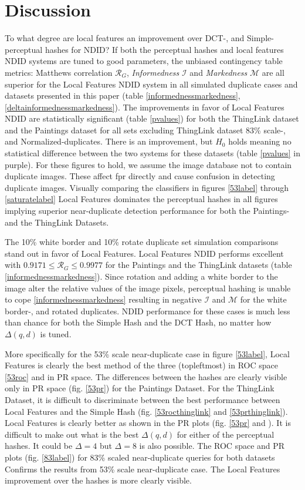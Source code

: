 \documentclass[english,12pt,a4paper,pdftex,elec,utf8, table]{aaltothesis}
\begin{document}
\section{Discussion}
To what degree are local features an improvement over DCT-, and Simple- perceptual hashes for NDID? If both the perceptual hashes and local features NDID systems are tuned to good parameters, the unbiased contingency table metrics: Matthews correlation $\mathcal{R}_G$, \emph{Informedness} $\mathcal{I}$ and \emph{Markedness} $\mathcal{M}$ are all superior for the Local Features NDID system in all simulated duplicate cases and datasets presented in this paper (table \ref{informednessmarkedness}, \ref{deltainformednessmarkedness}). The improvements in favor of Local Features NDID are statistically significant (table \ref{pvalues}) for both the ThingLink dataset and the Paintings dataset for all sets excluding ThingLink dataset 83\% scale-, and Normalized-duplicates. There is an improvement, but $H_0$ holds meaning no statistical difference between the two systems for these datasets (table \ref{pvalues} in purple). For these figures to hold, we assume the image database not to contain duplicate images. These affect fpr directly and cause confusion in detecting duplicate images. Visually comparing the classifiers in figures \ref{53label} through \ref{saturatelabel} Local Features dominates the perceptual hashes in all figures implying superior near-duplicate detection performance for both the Paintings- and the ThingLink Datasets.

The 10\% white border and 10\% rotate duplicate set simulation comparisons stand out in favor of Local Features. Local Features NDID performs excellent with $0.9171 \leq \mathcal{R}_G \leq 0.9977$ for the Paintings and the ThingLink datasets (table \ref{informednessmarkedness}). Since rotation and adding a white border to the image alter the relative values of the image pixels, perceptual hashing is unable to cope \ref{informednessmarkedness} resulting in negative $\mathcal{I}$ and $\mathcal{M}$ for the white border-, and rotated duplicates. NDID performance for these cases is much less than chance for both the Simple Hash and the DCT Hash, no matter how $\Delta(q,d)$ is tuned.

More specifically for the 53\% scale near-duplicate case in figure \ref{53label}, Local Features is clearly the best method of the three (topleftmost) in ROC space \ref{53roc} and in PR space. The differences between the hashes are clearly visible only in PR space (fig. \ref{53pr}) for the Paintings Dataset. For the ThingLink Dataset, it is difficult to discriminate between the best performance between Local Features and the Simple Hash (fig. \ref{53rocthinglink} and \ref{53prthinglink}). Local Features is clearly better as shown in the PR plots (fig. \ref{53pr} and ). It is difficult to make out what is the best $\Delta(q,d)$ for either of the perceptual hashes. It could be $\Delta=4$ but $\Delta=8$ is also possible. The ROC space and PR plots (fig. \ref{83label}) for 83\% scaled near-duplicate queries for both datasets Confirms the results from 53\% scale near-duplicate case. The Local Features improvement over the hashes is more clearly visible.
\end{document}
